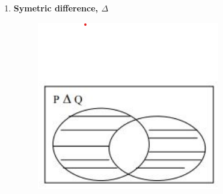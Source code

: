 \documentclass[12pt]{report}
\begin{document}
\begin{enumerate}
\begin{figure}[h!]
                \end{figure}
            \item \textbf{Symetric difference, $\Delta$} \\
                    \begin{figure}[h!]
                        \includegraphics[width=0.4\linewidth]{symmetric_diff.png}
                    \end{figure}
        \end{enumerate}
\end{document}

